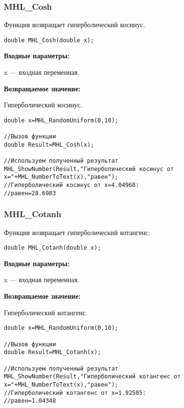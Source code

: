 \documentclass[a4paper,12pt]{article}
\begin{document}
\subsubsection{MHL\_Cosh}\label{MHL_Cosh}

Функция возвращает гиперболический косинус.


\begin{lstlisting}[label=code_syntax_MHL_Cosh,caption=Синтаксис]
double MHL_Cosh(double x);
\end{lstlisting}

\textbf{Входные параметры:}

 x --- входная переменная.

\textbf{Возвращаемое значение:}

Гиперболический косинус.


\begin{lstlisting}[label=code_use_MHL_Cosh,caption=Пример использования]
double x=MHL_RandomUniform(0,10);

//Вызов функции
double Result=MHL_Cosh(x);

//Используем полученный результат
MHL_ShowNumber(Result,"Гиперболический косинус от x="+MHL_NumberToText(x),"равен");
//Гиперболический косинус от x=4.04968:
//равен=28.6983
\end{lstlisting}

\subsubsection{MHL\_Cotanh}\label{MHL_Cotanh}

Функция возвращает гиперболический котангенс.


\begin{lstlisting}[label=code_syntax_MHL_Cotanh,caption=Синтаксис]
double MHL_Cotanh(double x);
\end{lstlisting}

\textbf{Входные параметры:}

 x --- входная переменная.

\textbf{Возвращаемое значение:}

Гиперболический котангенс.


\begin{lstlisting}[label=code_use_MHL_Cotanh,caption=Пример использования]
double x=MHL_RandomUniform(0,10);

//Вызов функции
double Result=MHL_Cotanh(x);

//Используем полученный результат
MHL_ShowNumber(Result,"Гиперболический котангенс от x="+MHL_NumberToText(x),"равен");
//Гиперболический котангенс от x=1.92505:
//равен=1.04348
\end{lstlisting}
\end{document}
